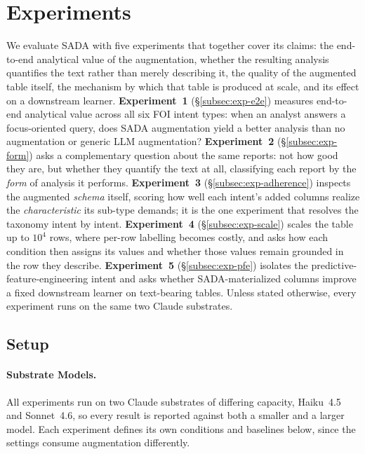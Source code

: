 
\section{Experiments}
\label{sec:experiments}

We evaluate SADA with five experiments that together cover its claims: the end-to-end analytical value of the augmentation, whether the resulting analysis quantifies the text rather than merely describing it, the quality of the augmented table itself, the mechanism by which that table is produced at scale, and its effect on a downstream learner. \textbf{Experiment~1} (\S\ref{subsec:exp-e2e}) measures end-to-end analytical value across all six FOI intent types: when an analyst answers a focus-oriented query, does SADA augmentation yield a better analysis than no augmentation or generic LLM augmentation? \textbf{Experiment~2} (\S\ref{subsec:exp-form}) asks a complementary question about the same reports: not how good they are, but whether they quantify the text at all, classifying each report by the \emph{form} of analysis it performs. \textbf{Experiment~3} (\S\ref{subsec:exp-adherence}) inspects the augmented \emph{schema} itself, scoring how well each intent's added columns realize the \emph{characteristic} its sub-type demands; it is the one experiment that resolves the taxonomy intent by intent. \textbf{Experiment~4} (\S\ref{subsec:exp-scale}) scales the table up to $10^4$ rows, where per-row labelling becomes costly, and asks how each condition then assigns its values and whether those values remain grounded in the row they describe. \textbf{Experiment~5} (\S\ref{subsec:exp-pfe}) isolates the predictive-feature-engineering intent and asks whether SADA-materialized columns improve a fixed downstream learner on text-bearing tables. Unless stated otherwise, every experiment runs on the same two Claude substrates.

\subsection{Setup}
\label{subsec:setup}

\paragraph{Substrate Models.} All experiments run on two Claude substrates of differing capacity, Haiku~4.5 and Sonnet~4.6, so every result is reported against both a smaller and a larger model. Each experiment defines its own conditions and baselines below, since the settings consume augmentation differently.

